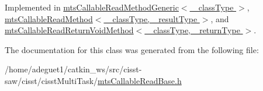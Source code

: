 Implemented in \hyperlink{classmts_callable_read_method_generic_af15dcc735815a28319e6aeaa7564785f}{mts\-Callable\-Read\-Method\-Generic$<$ \-\_\-class\-Type $>$}, \hyperlink{classmts_callable_read_method_ae08bd42677d0895a7fd4c80cc54cb4ff}{mts\-Callable\-Read\-Method$<$ \-\_\-class\-Type, \-\_\-result\-Type $>$}, and \hyperlink{classmts_callable_read_return_void_method_a27a38456119252878ace309de008be50}{mts\-Callable\-Read\-Return\-Void\-Method$<$ \-\_\-class\-Type, \-\_\-return\-Type $>$}.



The documentation for this class was generated from the following file\-:\begin{DoxyCompactItemize}
\item 
/home/adeguet1/catkin\-\_\-ws/src/cisst-\/saw/cisst/cisst\-Multi\-Task/\hyperlink{mts_callable_read_base_8h}{mts\-Callable\-Read\-Base.\-h}\end{DoxyCompactItemize}
